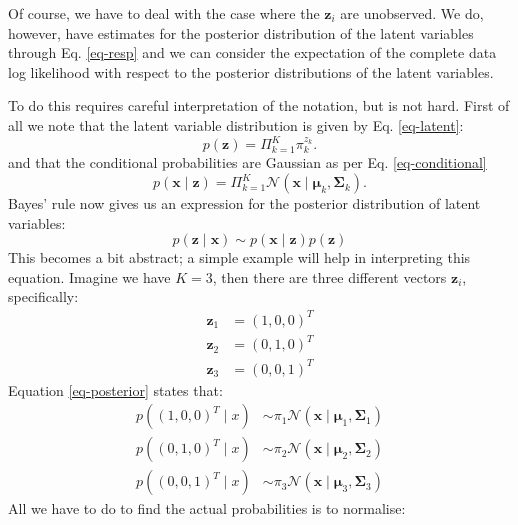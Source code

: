 Of course, we have to deal with the case where the $\boldsymbol{z}_i$ are unobserved. We do, however, have estimates for the posterior distribution
of the latent variables through Eq. \ref{eq-resp} and we can consider the expectation of the complete data log likelihood with respect to the posterior distributions of the
latent variables.

To do this requires careful interpretation of the notation, but is not hard. First of all we note that the latent variable distribution is given by Eq. \ref{eq-latent}:
$$
p(\boldsymbol{z}) = \Pi^K_{k=1} \pi^{z_k}_k.
$$
and that the conditional probabilities are Gaussian as per Eq. \ref{eq-conditional}
$$
p(\boldsymbol{x} \mid \boldsymbol{z} ) = \Pi^K_{k=1} \mathcal{N}(\boldsymbol{x} \mid \boldsymbol{\mu}_k, \boldsymbol{\Sigma}_k).
$$
Bayes' rule now gives us an expression for the posterior distribution of latent variables:
\begin{equation}
  p(\boldsymbol{z} \mid \boldsymbol{x} ) \sim p (\boldsymbol{x} \mid \boldsymbol{z}) p( \boldsymbol{z} )
  \label{eq-posterior}
\end{equation}
This becomes a bit abstract; a simple example will help in interpreting this equation. Imagine we have $K=3$, then there are
three different vectors $\boldsymbol{z}_i$, specifically:
\begin{align}
  \boldsymbol{z}_1 & = (1, 0, 0)^T \nonumber \\
  \boldsymbol{z}_2 & = (0, 1, 0)^T \nonumber \\
  \boldsymbol{z}_3 & = (0, 0, 1)^T
  \label{eq-example}
\end{align}
Equation \ref{eq-posterior} states that:
\begin{align}
  p( (1, 0, 0)^T \mid x) & \sim \pi_1 \mathcal{N}(\boldsymbol{x} \mid \boldsymbol{\mu}_1, \boldsymbol{\Sigma}_1) \nonumber \\
  p( (0, 1, 0)^T \mid x) & \sim \pi_2 \mathcal{N}(\boldsymbol{x} \mid \boldsymbol{\mu}_2, \boldsymbol{\Sigma}_2) \nonumber \\
  p( (0, 0, 1)^T \mid x) & \sim \pi_3 \mathcal{N}(\boldsymbol{x} \mid \boldsymbol{\mu}_3, \boldsymbol{\Sigma}_3) \nonumber 
\end{align}
All we have to do to find the actual probabilities is to normalise:

